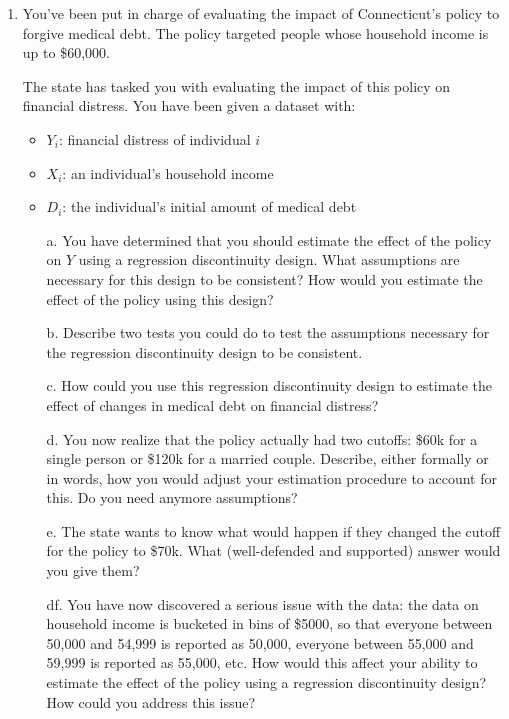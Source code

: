 \documentclass[11pt, a4paper]{article}
\begin{document}
\begin{enumerate}
    \item You've been put in charge of evaluating the impact of Connecticut's policy to forgive medical debt. The policy targeted people whose household income is up to \$60,000.
    
    The state has tasked you with evaluating the impact of this policy on financial distress. You have been given a dataset with:
    \begin{itemize}
        \item $Y_{i}$: financial distress of individual $i$     
        \item $X_{i}$: an individual's household income
        \item $D_{i}$: the individual's initial amount of medical debt
    \end{itemize}
    
    \begin{enumerate}
        \item[a.] You have determined that you should estimate the effect of the policy on $Y$ using a regression discontinuity design. What assumptions are necessary for this design to be consistent? How would you estimate the effect of the policy using this design?
        \item[b.] Describe two tests you could do to test the assumptions necessary for the regression discontinuity design to be consistent.
        \item[c.] How could you use this regression discontinuity design to estimate the effect of changes in medical debt on financial distress?
        \item[d.] You now realize that the policy actually had two cutoffs: \$60k for a single person or \$120k for a married couple. Describe, either formally or in words, how you would adjust your estimation procedure to account for this. Do you need anymore assumptions?
        \item[e.] The state wants to know what would happen if they changed the cutoff for the policy to \$70k. What  (well-defended and supported) answer would you give them?
        \item[df.] You have now discovered a serious issue with the data: the data on household income is bucketed in bins of \$5000, so that everyone between 50,000 and 54,999 is reported as 50,000, everyone between 55,000 and 59,999 is reported as 55,000, etc. How would this affect your ability to estimate the effect of the policy using a regression discontinuity design? How could you address this issue?
    \end{enumerate}
    

\end{enumerate}
\end{document}
